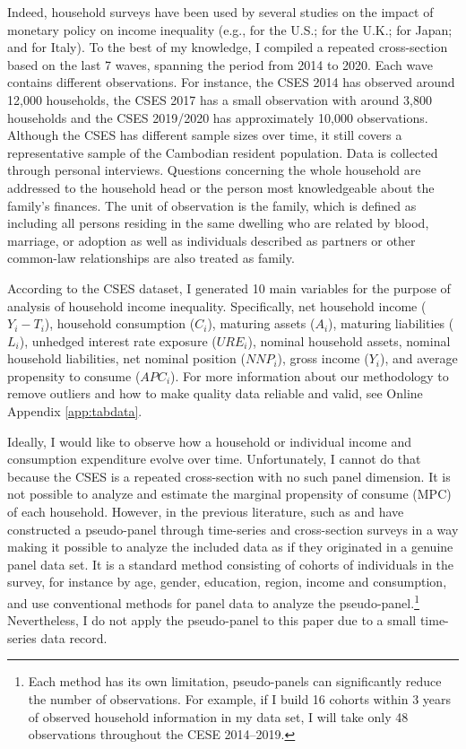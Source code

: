 \documentclass[11pt,letterpaper]{article}
\begin{document}
Indeed, household surveys have been used by several studies on the impact of monetary policy on income inequality (e.g., \citet{Coibion2017, Jappelli2014} for the U.S.; \citet{Mumtaz2017} for the U.K.; \citet{Inui2017} for Japan; and \citet{Casiraghi2018} for Italy). To the best of my knowledge, I compiled a repeated cross-section based on the last 7 waves, spanning the period from 2014 to 2020. Each wave contains different observations. For instance, the CSES 2014 has observed around 12,000 households, the CSES 2017 has a small observation with around 3,800 households and the CSES 2019/2020 has approximately 10,000 observations. Although the CSES has different sample sizes over time, it still covers a representative sample of the Cambodian resident population. Data is collected through personal interviews. Questions concerning the whole household are addressed to the household head or the person most knowledgeable about the family’s finances. The unit of observation is the family, which is defined as including all persons residing in the same dwelling who are related by blood, marriage, or adoption as well as individuals described as partners or other common-law relationships are also treated as family. 

According to the CSES dataset, I generated 10 main variables for the purpose of analysis of household income inequality. Specifically, net household income ($Y_{i}-T_{i}$), household consumption ($C_{i}$), maturing assets ($A_{i}$), maturing liabilities ($L_{i}$), unhedged interest rate exposure ($URE_{i}$), nominal household assets, nominal household liabilities, net nominal position ($NNP_{i}$), gross income ($Y_{i}$), and average propensity to consume ($APC_{i}$). For more information about our methodology to remove outliers and how to make quality data reliable and valid, see Online Appendix \ref{app:tabdata}. 

Ideally, I would like to observe how a household or individual income and consumption expenditure evolve over time. Unfortunately, I cannot do that because the CSES is a repeated cross-section with no such panel dimension. It is not possible to analyze and estimate the marginal propensity of consume (MPC) of each household. However, in the previous literature, such as \citet{Browning1985, Deaton1985} and \citet{Gardes2005} have constructed a pseudo-panel through time-series and cross-section surveys in a way making it possible to analyze the included data as if they originated in a genuine panel data set. It is a standard method consisting of cohorts of individuals in the survey, for instance by age, gender, education, region, income and consumption, and use conventional methods for panel data to analyze the pseudo-panel.\footnote{Each method has its own limitation, pseudo-panels can significantly reduce the number of observations. For example, if I build 16 cohorts within 3 years of observed household information in my data set, I will take only 48 observations throughout the CESE 2014--2019.} Nevertheless, I do not apply the pseudo-panel to this paper due to a small time-series data record.  
\end{document}
